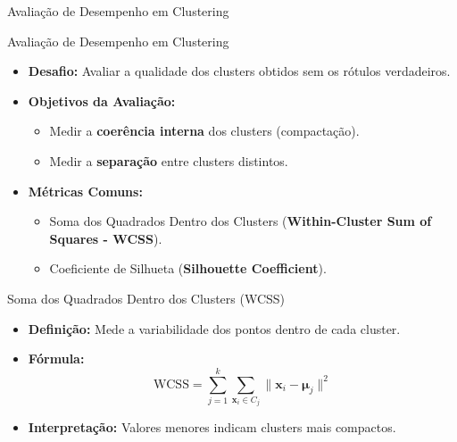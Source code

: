 \documentclass{beamer}
\begin{document}
\begin{frame}
    \centering
    \huge
    Avaliação de Desempenho em Clustering
\end{frame}


\begin{frame}{Avaliação de Desempenho em Clustering}
    \begin{itemize}
        \item \textbf{Desafio:} Avaliar a qualidade dos clusters obtidos sem os rótulos verdadeiros.
        \item \textbf{Objetivos da Avaliação:}
        \begin{itemize}
            \item Medir a \textbf{coerência interna} dos clusters (compactação).
            \item Medir a \textbf{separação} entre clusters distintos.
        \end{itemize}
        \item \textbf{Métricas Comuns:}
        \begin{itemize}
            \item Soma dos Quadrados Dentro dos Clusters (\textbf{Within-Cluster Sum of Squares - WCSS}).
            \item Coeficiente de Silhueta (\textbf{Silhouette Coefficient}).
        \end{itemize}
    \end{itemize}
\end{frame}

\begin{frame}{Soma dos Quadrados Dentro dos Clusters (WCSS)}
    \begin{itemize}
        \item \textbf{Definição:} Mede a variabilidade dos pontos dentro de cada cluster.
        \item \textbf{Fórmula:}
        \[
        \text{WCSS} = \sum_{j=1}^{k} \sum_{\mathbf{x}_i \in C_j} \|\mathbf{x}_i - \boldsymbol{\mu}_j\|^2
        \]
        \item \textbf{Interpretação:} Valores menores indicam clusters mais compactos.
    \end{itemize}
    \vspace{0.3cm}
\end{frame}
\end{document}

